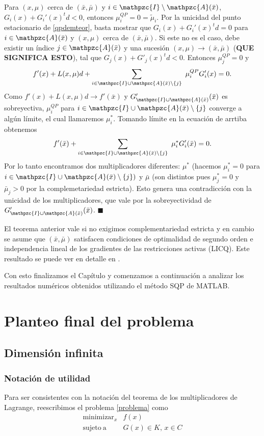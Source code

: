 \documentclass[a4paper,10pt]{book}
\newcommand{\bx}{\bar{x}}
\newcommand{\bmu}{\bar{\mu}}
\newcommand{\cI}{\mathpzc{I}}
\newcommand{\cA}{\mathpzc{A}}
\newenvironment{dem}{\vspace*{-0.1cm}{\it Demostraci\'on:}}{\hfill
$\blacksquare$\\}
\begin{document}
\begin{dem}
Para $(x,\mu)$ cerca de $(\bx,\bmu)$ y $i\in\cI\setminus\cA(\bx)$, $G_i(x)+G_i'(x)^td<0$, entonces $\mu_i^{QP}=0=\tilde{\mu}_i$. Por la unicidad del punto estacionario de \eqref{qpdemteor}, basta mostrar que  $G_i(x)+G_i'(x)^td=0$ para $i\in\cA(\bx)$ y $(x,\mu)$ cerca de  $(\bx,\bmu)$. Si este no es el caso, debe existir un índice $j\in\cA(\bx)$ y una sucesión $(x,\mu)\to(\bx,\bmu)$ (\textbf{QUE SIGNIFICA ESTO}), tal que $G_j(x)+G'_j(x)^td<0$. Entonces $\mu_j^{QP}=0$ y $$f'(x)+L(x,\mu)d+\sum_{i\in\cI\cup\cA(\bx)\setminus \{j\}} \ \mu_i^{QP}G_i'(x)=0.$$
Como $f'(x)+L(x,\mu)d\to f'(\bx)$ y $G'_{\cI\cup\cA(\bx)}(\bx)$ es sobreyectiva, $\mu_i^{QP}$ para $i\in\cI\cup\cA(\bx)\setminus \{j\}$ converge a algún límite, el cual llamaremos $\mu_i^*$. Tomando límite en la ecuación de arrtiba obtenemos $$f'(\bx)+\sum_{i\in\cI\cup\cA(\bx)\setminus \{j\}} \ \mu_i^*G_i'(\bx)=0.$$
Por lo tanto encontramos dos multiplicadores diferentes: $\mu^*$ (hacemos $\mu_i^*=0$ para $i\in\cI\cup\cA(\bx)\setminus \{j\})$ y $\bmu$ (son distintos pues $\mu^*_j=0$ y $\bmu_j>0$ por la complemetariedad estricta). Esto genera una contradicción con la unicidad de los multiplicadores, que vale por la sobreyectividad de $G'_{\cI\cup\cA(\bx)}(\bx)$.
\end{dem}

El teorema anterior vale si no exigimos complementariedad estricta y en cambio se asume que $(\bx,\bmu)$ satisfacen condiciones de optimalidad de segundo orden e independencia lineal de los gradientes de las restricciones activas (LICQ). Este resultado se puede ver en detalle en \cite[Theorem 15.4]{bonnans2006numerical}.

Con esto finalizamos el Capítulo y comenzamos a continuación a analizar los resultados numéricos obtenidos utilizando el método SQP de MATLAB.



\chapter{Planteo final del problema}

\section{Dimensión infinita}
\subsection{Notación de utilidad}

Para ser consistentes con la notación del teorema de los multiplicadores de Lagrange, reescribimos el problema \eqref{problema} como
\begin{equation}\label{pfinal}
\begin{array}{rl}
\displaystyle \mathop{\mathrm{minimizar}}_{x} & \displaystyle f(x) \\
\mathrm{sujeto \ a} & G(x)\in K,\, x\in C
\end{array}
\end{equation}
\end{document}
